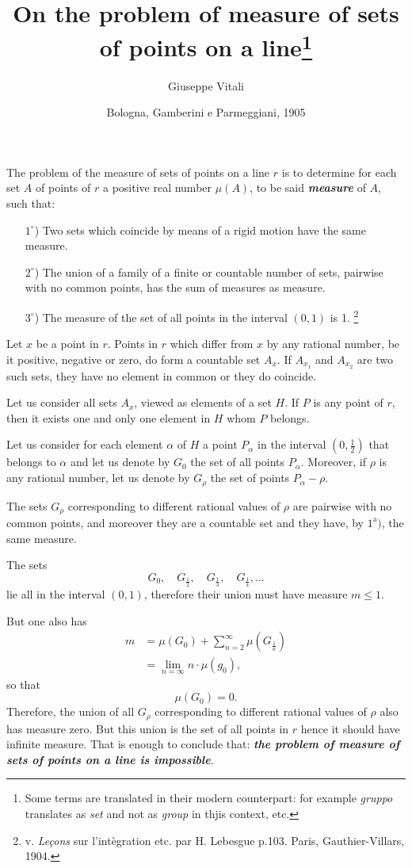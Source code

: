 \documentclass{article}
\title{On the problem of measure of sets of points on a line\thanks{Some terms are translated in their modern counterpart: for example {\em gruppo} translates as {\em set} and not as {\em group} in thjis context, etc.}}
\author{Giuseppe Vitali}
\date{\small Bologna, Gamberini e Parmeggiani, 1905}
\begin{document}
\maketitle

The problem of the measure of sets of points on a line $r$ is to determine for each set $A$ of points of $r$ a positive real number $\mu(A)$, to be said \emph{\bfseries measure} of $A$, such that:

\begin{itemize}
	\item[$1^\circ$)] Two sets which coincide by means of a rigid motion have the same measure.
	\item[$2^\circ$)] The union of a family of a finite or countable number of sets, pairwise with no common points, has the sum of measures as measure.
	\item[$3^\circ$)] The measure of the set of all points in the interval $(0,1)$ is 1. \footnote{ v. {\em Le\c cons} sur l'int\`egration etc. par H. Lebesgue p.103. Paris, Gauthier-Villars, 1904.}
\end{itemize}

Let $x$ be a point in $r$. Points in $r$ which differ from $x$ by any rational number, be it positive, negative or zero, do form a countable set $A_x$. If $A_{x_1}$ and $A_{x_2}$ are two such sets, they have no element in common or they do coincide.

Let us consider all sets $A_x$, viewed as elements of a set $H$. If $P$ is any point of $r$, then it exists one and only one element in $H$ whom $P$ belongs.

Let us consider for each element $\alpha$ of $H$ a point $P_\alpha$ in the interval $(0,\frac12)$ that belongs to $\alpha$ and let us denote by $G_0$ the set of all points $P_\alpha$. Moreover, if $\rho$ is any rational number, let us denote by $G_\rho$ the set of points $P_\alpha-\rho$.

The sets $G_\rho$ corresponding to different rational values of $\rho$ are pairwise with no common points, and moreover they are a countable set and they have, by $1^\textrm{a})$, the same measure.

The sets
\[
	G_0, \quad G_{\frac12}, \quad G_{\frac13}, \quad G_{\frac14}, \dots
\]
lie all in the interval $(0,1)$, therefore their union must have measure $m\leq1$.

But one also has
\begin{align*}
	m &= \mu(G_0) + \sum_{n=2}^\infty \mu\left(G_{\frac1n}\right) \\
		&= \lim_{n=\infty} n\cdot\mu(g_0),
\end{align*}
so that
\[
	\mu(G_0)=0.
\]
Therefore, the union of all $G_\rho$ corresponding to different rational values of $\rho$ also has measure zero. But this union is the set of all points in $r$ hence it should have infinite measure. That is enough to conclude that: \emph{\bfseries the problem of measure of sets of points on a line is impossible}.
\end{document}
